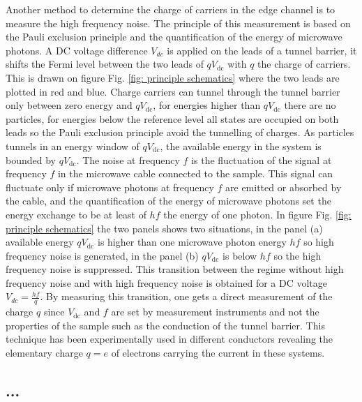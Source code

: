 Another method to determine the charge of carriers in the edge channel is to measure the high frequency noise.
The principle of this measurement is based on the Pauli exclusion principle and the quantification of the energy of microwave photons.
A DC voltage difference $V_{dc}$ is applied on the leads of a tunnel barrier, it shifts the Fermi level between the two leads of $qV_{\mathrm{dc}}$ with $q$ the charge of carriers.
This is drawn on figure Fig. \ref{fig: principle schematics} where the two leads are plotted in red and blue.
Charge carriers can tunnel through the tunnel barrier only between zero energy and $qV_{\mathrm{dc}}$, for energies higher than $qV_{\mathrm{dc}}$ there are no particles, for energies below the reference level all states are occupied on both leads so the Pauli exclusion principle avoid the tunnelling of charges.
As particles tunnels in an energy window of $qV_{\mathrm{dc}}$, the available energy in the system is bounded by $qV_{\mathrm{dc}}$.
The noise at frequency $f$ is the fluctuation of the signal at frequency $f$ in the microwave cable connected to the sample.
This signal can fluctuate only if microwave photons at frequency $f$ are emitted or absorbed by the cable, and the quantification of the energy of microwave photons set the energy exchange to be at least of $hf$ the energy of one photon.
In figure Fig. \ref{fig: principle schematics} the two panels shows two situations, in the panel (a) available energy $qV_{\mathrm{dc}}$ is higher than one microwave photon energy $hf$ so high frequency noise is generated, in the panel (b) $qV_{\mathrm{dc}}$ is below $hf$ so the high frequency noise is suppressed.
This transition between the regime without high frequency noise and with high frequency noise is obtained for a DC voltage $V_{dc} = \frac{hf}{q}$.
By measuring this transition, one gets a direct measurement of the charge $q$ since $V_{\mathrm{dc}}$ and $f$ are set by measurement instruments and not the properties of the sample such as the conduction of the tunnel barrier. 
This technique has been experimentally used in different conductors \cite{schoelkopf1997frequency,zakka2007experimental,gabelli2009high} revealing the elementary charge $q = e$ of electrons carrying the current in these systems.


\subsection{\texorpdfstring{...}{...}}


